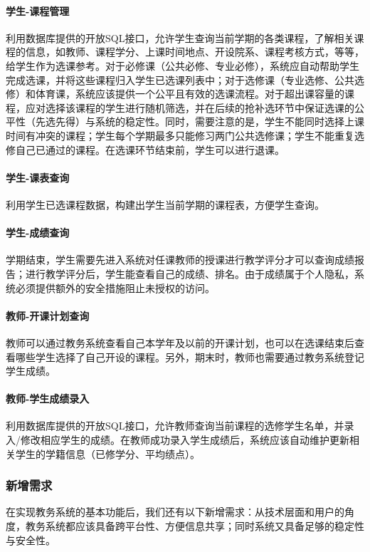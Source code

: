 \paragraph{学生-课程管理}

利用数据库提供的开放SQL接口，允许学生查询当前学期的各类课程，了解相关课程的信息，如教师、课程学分、上课时间地点、开设院系、课程考核方式，等等，给学生作为选课参考。对于必修课（公共必修、专业必修），系统应自动帮助学生完成选课，并将这些课程归入学生已选课列表中；对于选修课（专业选修、公共选修）和体育课，系统应该提供一个公平且有效的选课流程。对于超出课容量的课程，应对选择该课程的学生进行随机筛选，并在后续的抢补选环节中保证选课的公平性（先选先得）与系统的稳定性。同时，需要注意的是，学生不能同时选择上课时间有冲突的课程；学生每个学期最多只能修习两门公共选修课；学生不能重复选修自己已通过的课程。在选课环节结束前，学生可以进行退课。

\paragraph{学生-课表查询}
  
利用学生已选课程数据，构建出学生当前学期的课程表，方便学生查询。

\paragraph{学生-成绩查询}
  
学期结束，学生需要先进入系统对任课教师的授课进行教学评分才可以查询成绩报告；进行教学评分后，学生能查看自己的成绩、排名。由于成绩属于个人隐私，系统必须提供额外的安全措施阻止未授权的访问。

\paragraph{教师-开课计划查询}
  
教师可以通过教务系统查看自己本学年及以前的开课计划，也可以在选课结束后查看哪些学生选择了自己开设的课程。另外，期末时，教师也需要通过教务系统登记学生成绩。
  
\paragraph{教师-学生成绩录入}
  
利用数据库提供的开放SQL接口，允许教师查询当前课程的选修学生名单，并录入/修改相应学生的成绩。在教师成功录入学生成绩后，系统应该自动维护更新相关学生的学籍信息（已修学分、平均绩点）。

\subsubsection{新增需求}
在实现教务系统的基本功能后，我们还有以下新增需求：从技术层面和用户的角度，教务系统都应该具备跨平台性、方便信息共享；同时系统又具备足够的稳定性与安全性。

